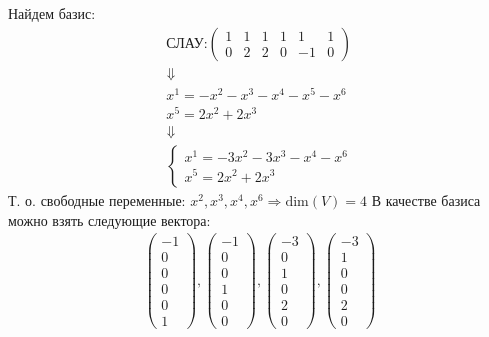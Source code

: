 Найдем базис:
\begin{gather}
    \text{СЛАУ:}
    \begin{pmatrix}
        1 & 1 & 1 & 1 &  1 & 1 \\
        0 & 2 & 2 & 0 & -1 & 0
    \end{pmatrix} \\
    \Downarrow \\
    x^1 = - x^2 - x^3 - x^4 - x^5 - x^6 \\
    x^5 = 2 x^2 + 2 x^3 \\
    \Downarrow \\
    \begin{cases}
        x^1 = -3x^2 - 3x^3 - x^4 - x^6 \\
        x^5 = 2x^2 + 2x^3
    \end{cases}
\end{gather}
Т. о. свободные переменные: $x^2, x^3, x^4, x^6 \Longrightarrow \text{dim}(V) = 4$
В качестве базиса можно взять следующие вектора:
\begin{gather}
    \begin{pmatrix}
        -1\\0\\0\\0\\0\\1
    \end{pmatrix},
    \begin{pmatrix}
        -1\\0\\0\\1\\0\\0
    \end{pmatrix},
    \begin{pmatrix}
        -3\\0\\1\\0\\2\\0
    \end{pmatrix},
    \begin{pmatrix}
        -3\\1\\0\\0\\2\\0
    \end{pmatrix}
\end{gather} 